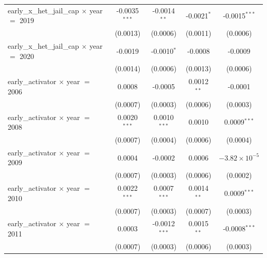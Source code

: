 \begin{tabular}{lcccc}
   early\_x\_het\_jail\_cap $\times$ year $=$ 2019      & -0.0035$^{***}$       & -0.0014$^{**}$            & -0.0021$^{*}$          & -0.0015$^{***}$\\   
                                                        & (0.0013)              & (0.0006)                  & (0.0011)               & (0.0006)\\   
   early\_x\_het\_jail\_cap $\times$ year $=$ 2020      & -0.0019               & -0.0010$^{*}$             & -0.0008                & -0.0009\\   
                                                        & (0.0014)              & (0.0006)                  & (0.0013)               & (0.0006)\\   
   early\_activator $\times$ year $=$ 2006              & 0.0008                & -0.0005                   & 0.0012$^{**}$          & -0.0001\\   
                                                        & (0.0007)              & (0.0003)                  & (0.0006)               & (0.0003)\\   
   early\_activator $\times$ year $=$ 2008              & 0.0020$^{***}$        & 0.0010$^{***}$            & 0.0010                 & 0.0009$^{***}$\\   
                                                        & (0.0007)              & (0.0004)                  & (0.0006)               & (0.0004)\\   
   early\_activator $\times$ year $=$ 2009              & 0.0004                & -0.0002                   & 0.0006                 & $-3.82\times 10^{-5}$\\    
                                                        & (0.0007)              & (0.0003)                  & (0.0006)               & (0.0002)\\   
   early\_activator $\times$ year $=$ 2010              & 0.0022$^{***}$        & 0.0007$^{***}$            & 0.0014$^{**}$          & 0.0009$^{***}$\\   
                                                        & (0.0007)              & (0.0003)                  & (0.0007)               & (0.0003)\\   
   early\_activator $\times$ year $=$ 2011              & 0.0003                & -0.0012$^{***}$           & 0.0015$^{**}$          & -0.0008$^{***}$\\   
                                                        & (0.0007)              & (0.0003)                  & (0.0006)               & (0.0003)\\   

\end{tabular}
